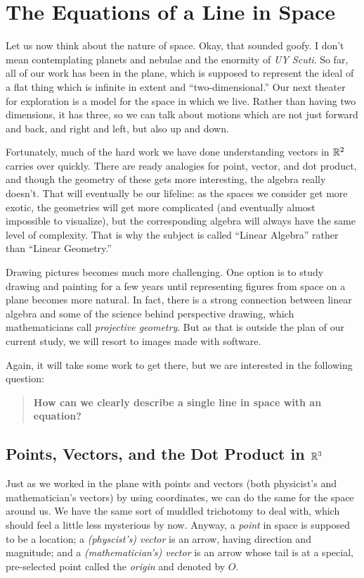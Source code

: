 \documentclass[00-livre-main.tex]{subfiles}
\begin{document}
\chapter{The Equations of a Line in Space}

Let us now think about the nature of space. Okay, that sounded goofy. I don't mean contemplating planets and nebulae and the enormity of \emph{UY Scuti}. 
So far, all of our work has been in the plane, which is supposed to represent the ideal of a flat thing which is infinite in extent and ``two-dimensional.'' Our next theater for exploration is a model for the space in which we live. Rather than having two dimensions, it has three, so we can talk about motions which are not just forward and back, and right and left, but also up and down.

Fortunately, much of the hard work we have done understanding vectors in $\mathbb{R}^2$ carries over quickly. There are ready analogies for point, vector, and dot product, and though the geometry of these gets more interesting, the algebra really doesn't. That will eventually be our lifeline: as the spaces we consider get more exotic, the geometries will get more complicated (and eventually almost impossible to visualize), but the corresponding algebra will always have the same level of complexity. That is why the subject is called ``Linear Algebra'' rather than ``Linear Geometry.''

Drawing pictures becomes much more challenging. One option is to study drawing and painting for a few years until representing figures from space on a plane becomes more natural. In fact, there is a strong connection between linear algebra and some of the science behind perspective drawing, which mathematicians call \emph{projective geometry}. But as that is outside the plan of our current study, we will resort to images made with software.

Again, it will take some work to get there, but we are interested in the following question:

\begin{quotation}
\textbf{\large How can we clearly describe a single line in space with an equation?}
\end{quotation}


\section*{Points, Vectors, and the Dot Product in $\mathbb{R}^3$}

Just as we worked in the plane with points and vectors (both physicist's and mathematician's vectors) by using coordinates, we can do the same for the space around us. We have the same sort of muddled trichotomy to deal with, which should feel a little less mysterious by now. Anyway, a \emph{point} in space is supposed to be a location; a \emph{(physcist's) vector} is an arrow, having direction and magnitude; and a \emph{(mathematician's) vector} is an arrow whose tail is at a special, pre-selected point called the \emph{origin} and denoted by $O$.
\end{document}
